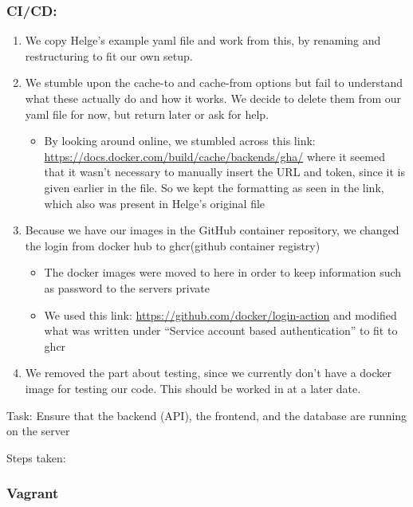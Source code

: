 \subsubsection{CI/CD:}
\label{log:cicd}

\begin{enumerate}
    \item We copy Helge's example yaml file and work from this, by renaming and restructuring to fit our own setup.
    \item We stumble upon the cache-to and cache-from options but fail to understand what these actually do and how it works. We decide to delete them from our yaml file for now, but return later or ask for help.

    \begin{itemize}
        \item By looking around online, we stumbled across this link: \url{https://docs.docker.com/build/cache/backends/gha/} where it seemed that it wasn't necessary to manually insert the URL and token, since it is given earlier in the file. So we kept the formatting as seen in the link, which also was present in Helge's original file
    \end{itemize}
    \item Because we have our images in the GitHub container repository, we changed the login from docker hub to ghcr(github container registry)

    \begin{itemize}
        \item The docker images were moved to here in order to keep information such as password to the servers private
        \item We used this link: \url{https://github.com/docker/login-action} and modified what was written under ``Service account based authentication'' to fit to ghcr
    \end{itemize}
    \item We removed the part about testing, since we currently don't have a docker image for testing our code. This should be worked in at a later date.
\end{enumerate}

Task: Ensure that the backend (API), the frontend, and the database are
running on the server

Steps taken:

\subsubsection{Vagrant}
\label{log:vagrant}

